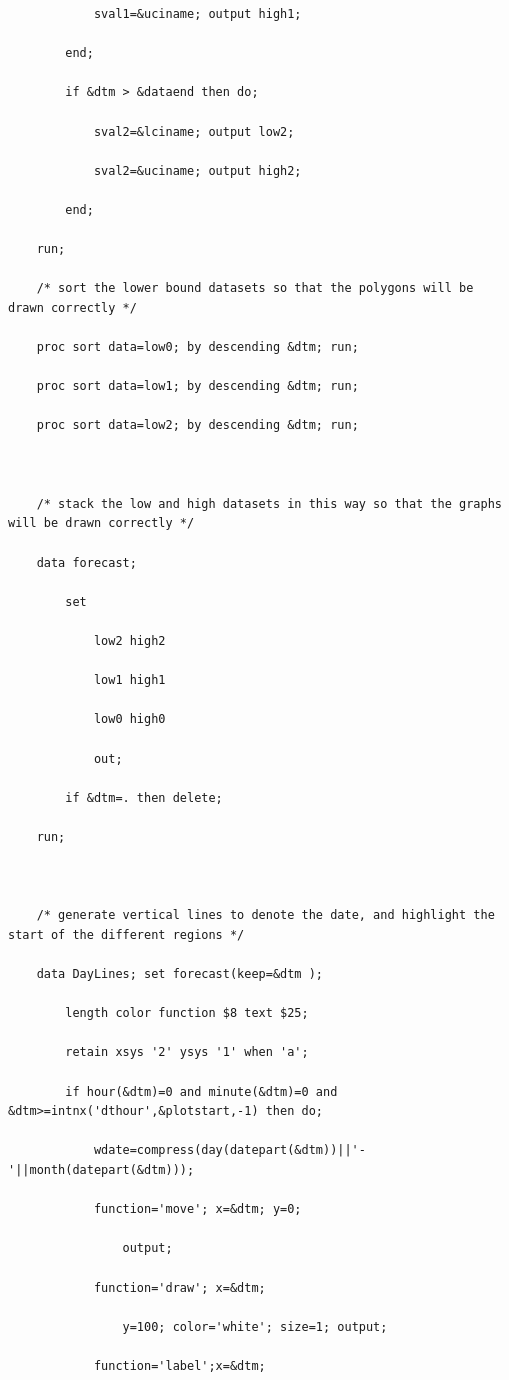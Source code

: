 \documentclass[10pt]{sugconf-ish}
\begin{document}
\begin{verbatim}
            sval1=&uciname; output high1; 

        end;

        if &dtm > &dataend then do; 

            sval2=&lciname; output low2; 

            sval2=&uciname; output high2;

        end;

    run;

    /* sort the lower bound datasets so that the polygons will be drawn correctly */

    proc sort data=low0; by descending &dtm; run;

    proc sort data=low1; by descending &dtm; run;

    proc sort data=low2; by descending &dtm; run;



    /* stack the low and high datasets in this way so that the graphs will be drawn correctly */

    data forecast; 

        set  

            low2 high2 

            low1 high1 

            low0 high0 

            out; 

        if &dtm=. then delete; 

    run;



    /* generate vertical lines to denote the date, and highlight the start of the different regions */

    data DayLines; set forecast(keep=&dtm );

        length color function $8 text $25;

        retain xsys '2' ysys '1' when 'a';

        if hour(&dtm)=0 and minute(&dtm)=0 and &dtm>=intnx('dthour',&plotstart,-1) then do;

            wdate=compress(day(datepart(&dtm))||'-'||month(datepart(&dtm)));

            function='move'; x=&dtm; y=0; 

                output;

            function='draw'; x=&dtm; 

                y=100; color='white'; size=1; output;

            function='label';x=&dtm; 


\end{verbatim}
\end{document}
